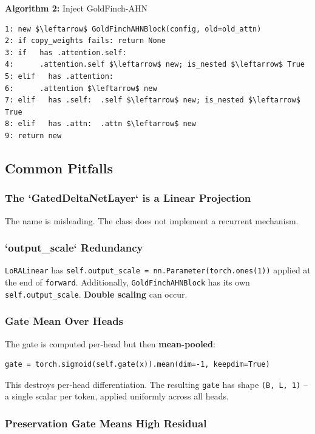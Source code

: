 \textbf{Algorithm 2:} Inject GoldFinch-AHN
\begin{lstlisting}
1: new $\leftarrow$ GoldFinchAHNBlock(config, old=old_attn)
2: if copy_weights fails: return None
3: if   has .attention.self:
4:      .attention.self $\leftarrow$ new; is_nested $\leftarrow$ True
5: elif   has .attention:
6:      .attention $\leftarrow$ new
7: elif   has .self:  .self $\leftarrow$ new; is_nested $\leftarrow$ True
8: elif   has .attn:  .attn $\leftarrow$ new
9: return new
\end{lstlisting}

\subsection{Common Pitfalls}

\subsubsection{The `GatedDeltaNetLayer` is a Linear Projection}

The name is misleading. The class does not implement a recurrent mechanism.

\subsubsection{`output\_scale` Redundancy}

\texttt{LoRALinear} has \texttt{self.output\_scale = nn.Parameter(torch.ones(1))} applied 
at the end of \texttt{forward}. Additionally, \texttt{GoldFinchAHNBlock} has its own 
\texttt{self.output\_scale}. \textbf{Double scaling} can occur.

\subsubsection{Gate Mean Over Heads}

The gate is computed per-head but then \textbf{mean-pooled}:

\begin{lstlisting}
gate = torch.sigmoid(self.gate(x)).mean(dim=-1, keepdim=True)
\end{lstlisting}

This destroys per-head differentiation. The resulting \texttt{gate} has shape 
\texttt{(B, L, 1)} -- a single scalar per token, applied uniformly across all heads.

\subsubsection{Preservation Gate Means High Residual}

